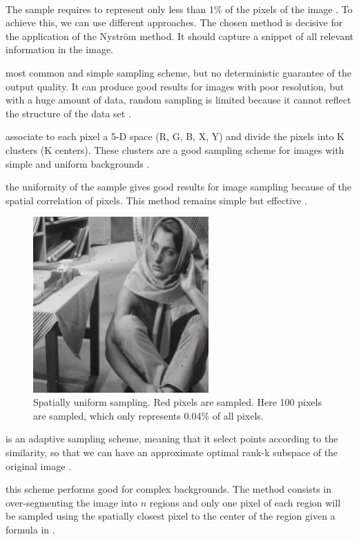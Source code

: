 \paragraph{}
The sample requires to represent only less than 1\% of the pixels of the image \cite{fowlkes_spectral_2004}.
To achieve this, we can use different approaches.
The chosen method is decisive for the application of the Nystr\"om method.
It should capture a snippet of all relevant information in the image.
\begin{description}[align=left]
 \item [Random sampling (RS)] most common and simple sampling scheme, but no deterministic guarantee of the output quality. It can produce good results for images with poor resolution, but with a huge amount of data, random sampling is limited because it cannot reflect the structure of the data set \cite{zhan_improved_2017}.
 \item [K-means sampling (KS)] associate to each pixel a 5-D space (R, G, B, X, Y) and divide the pixels into K clusters (K centers). These clusters are a good sampling scheme for images with simple and uniform backgrounds \cite{kao_sampling_2012} \cite{zhang_improved_2008}.
 \item [Uniform spatially sampling] the uniformity of the sample gives good results for image sampling because of the spatial correlation of pixels. This method remains simple but effective \cite{glide_2014}.
  \begin{figure}[H]
      \centering
      \includegraphics[width=0.6\textwidth]{img/spatiallyUniformSampling.png}
      \caption{Spatially uniform sampling. Red pixels are sampled. Here 100 pixels are sampled, which only represents 0.04\% of all pixels.}
  \end{figure}
 \item [Incremental sampling (INS)] is an adaptive sampling scheme, meaning that it select points according to the similarity, so that we can have an approximate optimal rank-k subspace of the original image \cite{zhan_improved_2017}.
 \item [Mean-shift segmentation-based sampling] this scheme performs good for complex backgrounds. The method consists in over-segmenting the image into \(n\) regions and only one pixel of each region will be sampled using the spatially closest pixel to the center of the region given a formula in \cite{kao_sampling_2012}.
\end{description}

